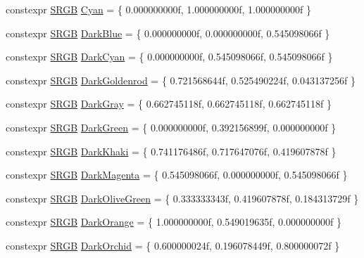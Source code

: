 \begin{DoxyCompactItemize}
\item 
constexpr \hyperlink{structmage_1_1_s_r_g_b}{S\+R\+GB} \hyperlink{namespacemage_1_1color_ab03cb555666f672d222c07e510300ffe}{Cyan} = \{ 0.\+000000000f, 1.\+000000000f, 1.\+000000000f \}
\item 
constexpr \hyperlink{structmage_1_1_s_r_g_b}{S\+R\+GB} \hyperlink{namespacemage_1_1color_aa375c6defcd2375f1bafe84a3b8e9981}{Dark\+Blue} = \{ 0.\+000000000f, 0.\+000000000f, 0.\+545098066f \}
\item 
constexpr \hyperlink{structmage_1_1_s_r_g_b}{S\+R\+GB} \hyperlink{namespacemage_1_1color_a435926100062e09f81a1a03e4c290bb4}{Dark\+Cyan} = \{ 0.\+000000000f, 0.\+545098066f, 0.\+545098066f \}
\item 
constexpr \hyperlink{structmage_1_1_s_r_g_b}{S\+R\+GB} \hyperlink{namespacemage_1_1color_a8e21cfca54393867e99fa09989c8bbc1}{Dark\+Goldenrod} = \{ 0.\+721568644f, 0.\+525490224f, 0.\+043137256f \}
\item 
constexpr \hyperlink{structmage_1_1_s_r_g_b}{S\+R\+GB} \hyperlink{namespacemage_1_1color_ada693453638824ed651a3c35fd9a9ac5}{Dark\+Gray} = \{ 0.\+662745118f, 0.\+662745118f, 0.\+662745118f \}
\item 
constexpr \hyperlink{structmage_1_1_s_r_g_b}{S\+R\+GB} \hyperlink{namespacemage_1_1color_a7a527173536e78422cd428ac7bf107e1}{Dark\+Green} = \{ 0.\+000000000f, 0.\+392156899f, 0.\+000000000f \}
\item 
constexpr \hyperlink{structmage_1_1_s_r_g_b}{S\+R\+GB} \hyperlink{namespacemage_1_1color_a622f8ca6870bfcf09bb211883b8a9beb}{Dark\+Khaki} = \{ 0.\+741176486f, 0.\+717647076f, 0.\+419607878f \}
\item 
constexpr \hyperlink{structmage_1_1_s_r_g_b}{S\+R\+GB} \hyperlink{namespacemage_1_1color_a6fa40a1e1b23a9b75e0a21090d1285d6}{Dark\+Magenta} = \{ 0.\+545098066f, 0.\+000000000f, 0.\+545098066f \}
\item 
constexpr \hyperlink{structmage_1_1_s_r_g_b}{S\+R\+GB} \hyperlink{namespacemage_1_1color_a6d920e13c613156ed78bda2431e88f1a}{Dark\+Olive\+Green} = \{ 0.\+333333343f, 0.\+419607878f, 0.\+184313729f \}
\item 
constexpr \hyperlink{structmage_1_1_s_r_g_b}{S\+R\+GB} \hyperlink{namespacemage_1_1color_a53a4dc6b5218c497badc8e1438611f9f}{Dark\+Orange} = \{ 1.\+000000000f, 0.\+549019635f, 0.\+000000000f \}
\item 
constexpr \hyperlink{structmage_1_1_s_r_g_b}{S\+R\+GB} \hyperlink{namespacemage_1_1color_af5db2e77f3bd7749137a5d2719fb6c14}{Dark\+Orchid} = \{ 0.\+600000024f, 0.\+196078449f, 0.\+800000072f \}

\end{DoxyCompactItemize}
